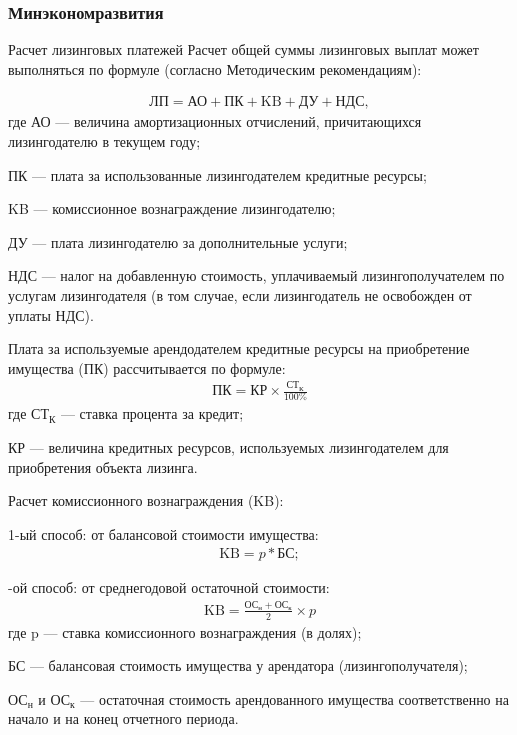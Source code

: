 \documentclass[_Banking_p3.tex]{subfiles}
\begin{document}
\subsubsection{Минэкономразвития}
\begin{frame}[allowframebreaks]{Расчет лизинговых платежей}
Расчет общей суммы лизинговых выплат может выполняться по формуле (согласно Методическим рекомендациям):

\begin{align}
\text{ЛП} = \text{АО} + \text{ПК} + \text{KB}+ \text{ДУ} + \text{НДС},
\end{align}
где  АО — величина амортизационных отчислений, причитающихся лизингодателю в текущем году; 

\pagebreak
ПК — плата за использованные лизингодателем кредитные ресурсы; 

KB — комиссионное вознаграждение лизингодателю; 

ДУ — плата лизингодателю за дополнительные услуги; 

НДС — налог на добавленную стоимость, уплачиваемый лизингополучателем по услугам лизингодателя (в том случае, если лизингодатель не освобожден от уплаты НДС).
\end{frame}
\begin{frame}
Плата за используемые арендодателем кредитные ресурсы на приобретение имущества (ПК) рассчитывается по формуле:
\begin{align}
\text{ПК}=\text{КР}\times \frac{\text{СТ}_\text{К}}{100\%}
\end{align}
где $\text{СТ}_\text{К}$ — ставка процента за кредит;

КР — величина кредитных ресурсов, используемых лизингодателем для приобретения объекта лизинга.
\end{frame}

\begin{frame}[allowframebreaks]
Расчет комиссионного вознаграждения (KB):

1-ый способ: от балансовой стоимости имущества:
\begin{align}
\text{KB} = p * \text{БС};
\end{align}

-ой способ: от среднегодовой остаточной стоимости:
\begin{align}
\text{KB}=\frac{\text{ОС}_\text{н}+\text{ОС}_\text{к}}{2} \times p
\end{align}
где	p — ставка комиссионного вознаграждения (в долях);

БС — балансовая стоимость имущества у арендатора (лизингополучателя);

$\text{ОС}_\text{н}$ и $\text{ОС}_\text{к}$ — остаточная стоимость арендованного имущества соответственно на начало и на конец отчетного периода.

\end{frame}
\end{document}
